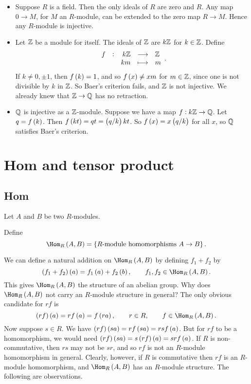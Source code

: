 \begin{example*}
\hfill
\begin{itemize}
\item Suppose $ R $ is a field. Then the only ideals of $ R $ are zero and $ R $. Any map $ 0 \to M $, for $ M $ an $ R $-module, can be extended to the zero map $ R \to M $. Hence any $ R $-module is injective.
\item Let $ \mathbb{Z} $ be a module for itself. The ideals of $ \mathbb{Z} $ are $ k\mathbb{Z} $ for $ k \in \mathbb{Z} $. Define
$$ \function[f]{k\ZZ}{\ZZ}{km}{m}. $$
If $ k \ne 0, \pm 1 $, then $ f\br{k} = 1 $, and so $ f\br{x} \ne xm $ for $ m \in \mathbb{Z} $, since one is not divisible by $ k $ in $ \mathbb{Z} $. So Baer's criterion fails, and $ \mathbb{Z} $ is not injective. We already knew that $ \mathbb{Z} \to \mathbb{Q} $ has no retraction.
\item $ \mathbb{Q} $ is injective as a $ \mathbb{Z} $-module. Suppose we have a map $ f : k\mathbb{Z} \to \mathbb{Q} $. Let $ q = f\br{k} $. Then $ f\br{kt} = qt = \br{q / k}kt $. So $ f\br{x} = x\br{q / k} $ for all $ x $, so $ \mathbb{Q} $ satisfies Baer's criterion.
\end{itemize}
\end{example*}

\pagebreak

\section{Hom and tensor product}

\subsection{Hom}


Let $ A $ and $ B $ be two $ R $-modules.

\begin{definition}
Define
$$ \Hom_R\br{A, B} = \cbr{\text{$ R $-module homomorphisms} \ A \to B}. $$
\end{definition}

We can define a natural addition on $ \Hom_R\br{A, B} $ by defining $ f_1 + f_2 $ by
$$ \br{f_1 + f_2}\br{a} = f_1\br{a} + f_2\br{b}, \qquad f_1, f_2 \in \Hom_R\br{A, B}. $$
This gives $ \Hom_R\br{A, B} $ the structure of an abelian group. Why does $ \Hom_R\br{A, B} $ not carry an $ R $-module structure in general? The only obvious candidate for $ rf $ is
$$ \br{rf}\br{a} = rf\br{a} = f\br{ra}, \qquad r \in R, \qquad f \in \Hom_R\br{A, B}. $$
Now suppose $ s \in R $. We have $ \br{rf}\br{sa} = rf\br{sa} = rsf\br{a} $. But for $ rf $ to be a homomorphism, we would need $ \br{rf}\br{sa} = s\br{rf}\br{a} = srf\br{a} $. If $ R $ is non-commutative, then $ rs $ may not be $ sr $, and so $ rf $ is not an $ R $-module homomorphism in general. Clearly, however, if $ R $ is commutative then $ rf $ is an $ R $-module homomorphism, and $ \Hom_R\br{A, B} $ has an $ R $-module structure. The following are observations.

